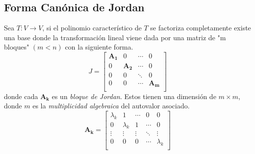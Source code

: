 \subsection{Forma Canónica de Jordan}
Sea \( T: V \rightarrow V\), si el polinomio característico de $T$ se factoriza completamente
existe una base donde la transformación lineal viene dada por una matriz de "m bloques" $(m<n)$ con la siguiente forma.
\begin{equation*}
    J = 
    \begin{bmatrix}
    \bm{A_1} & 0 & \cdots & 0\\
    0 & \bm{A_2} & \cdots & 0\\
    0 & 0 & \ddots & 0\\
    0 & 0 & \cdots & \bm{A_m}\\
    \end{bmatrix}
\end{equation*}
donde cada \(\bm{A_k}\) es un \textit{bloque de Jordan}. Estos tienen una dimensión de $m \times m$, 
donde $m$ es la \textit{multiplicidad algebraica} del autovalor asociado.
\begin{equation*}
    \bm{A_k} = 
    \begin{bmatrix}
    \lambda_k & 1 & \cdots & 0 & 0\\
    0 & \lambda_k & 1 & \cdots & 0\\
    \vdots & \vdots & \vdots & \ddots & \vdots\\
    0 & 0 & 0 & \cdots & \lambda_k\\
    \end{bmatrix}
\end{equation*}

